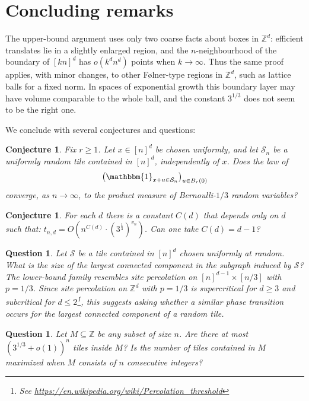 \documentclass{article}
\newcommand{\Z}{\mathbb{Z}}
\newtheorem{question}[theorem]{Question}
\newtheorem{conjecture}[theorem]{Conjecture}
\begin{document}
\section{Concluding remarks}

The upper-bound argument uses only two coarse facts about boxes in \(\Z^d\): efficient translates lie in a slightly enlarged region, and the \(n\)-neighbourhood of the boundary of \([kn]^d\) has \(o(k^d n^d)\) points when \(k\to\infty\). Thus the same proof applies, with minor changes, to other Følner-type regions in \(\Z^d\), such as lattice balls for a fixed norm. In spaces of exponential growth this boundary layer may have volume comparable to the whole ball, and the constant \(3^{1/3}\) does not seem to be the right one.

We conclude with several conjectures and questions:

\begin{conjecture}
    Fix \(r\ge 1\). Let \(x\in[n]^d\) be chosen uniformly, and let \(\mathcal S_n\) be a uniformly random tile contained in \([n]^d\), independently of \(x\). Does the law of
    \[
        \bigl(\mathbbm{1}_{x+u\in\mathcal S_n}\bigr)_{u\in B_r(0)}
    \]
    converge, as \(n\to\infty\), to the product measure of Bernoulli-\(1/3\) random variables?
\end{conjecture}

\begin{conjecture}
    For each $d$ there is a constant $C(d)$ that depends only on $d$ such that: $t_{n,d} = O(n^{C(d)} \cdot (3^{\frac{1}{3}})^{v_n})$. Can one take $C(d)=d-1$?
\end{conjecture}


\begin{question}
    Let \(\mathcal S\) be a tile contained in $[n]^d$ chosen uniformly at random. What is the size of the largest connected component in the subgraph induced by \(\mathcal S\)? The lower-bound family resembles site percolation on \([n]^{d-1}\times[n/3]\) with \(p=1/3\). Since site percolation on \(\Z^d\) with \(p=1/3\) is supercritical for \(d\ge 3\) and subcritical for \(d\le 2\)\footnote{See \url{https://en.wikipedia.org/wiki/Percolation_threshold}}, this suggests asking whether a similar phase transition occurs for the largest connected component of a random tile.
\end{question}

\begin{question}
    Let $M\subseteq \Z$ be any subset of size $n$. Are there at most $\left( 3^{1/3} + o(1) \right)^n$ tiles inside $M$? Is the number of tiles contained in \(M\) maximized when \(M\) consists of \(n\) consecutive integers?
\end{question}
\end{document}
